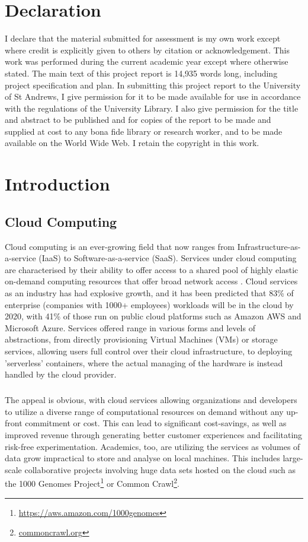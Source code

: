 \documentclass{report}
\begin{document}
\chapter*{Declaration}
I declare that the material submitted for assessment
is my own work except where credit is explicitly
given to others by citation or acknowledgement. This
work was performed during the current academic year
except where otherwise stated.
The main text of this project report is 14,935 words
long, including project specification and plan.
In submitting this project report to the University of St
Andrews, I give permission for it to be made
available for use in accordance with the regulations of the University Library. I also give permission for the title and abstract to be published and for copies of the report to be made and supplied at cost to any bona fide library or research worker, and to be made available on the World Wide Web. I retain the copyright in this work.
\newpage
\tableofcontents
\listoffigures
\newpage
{}
\chapter{Introduction}
\section{Cloud Computing}
Cloud computing is an ever-growing field that now ranges from Infrastructure-as-a-service (IaaS) to Software-as-a-service (SaaS). Services under cloud computing are characterised by their ability to offer access to a shared pool of highly elastic on-demand computing resources that offer broad network access \cite{Pallis2010, Mell2011}. Cloud services as an industry has had explosive growth, and it has been predicted that 83\% of enterprise (companies with 1000+ employees) workloads will be in the cloud by 2020\cite{Intricately2019}, with 41\% of those run on public cloud platforms such as Amazon AWS and Microsoft Azure. Services offered range in various forms and levels of abstractions, from directly provisioning Virtual Machines (VMs) or storage services, allowing users full control over their cloud infrastructure, to deploying 'serverless' containers, where the actual managing of the hardware is instead handled by the cloud provider.

\paragraph{}
The appeal is obvious, with cloud services allowing organizations and developers to utilize a diverse range of computational resources on demand without any up-front commitment or cost\cite{Armbrust2009}. This can lead to significant cost-savings, as well as improved revenue through generating better customer experiences and facilitating risk-free experimentation\cite{Power2018}. Academics, too, are utilizing the services as volumes of data grow impractical to store and analyse on local machines\cite{Berriman2013, Ruiz-Alvarez2011}. This includes large-scale collaborative projects involving huge data sets hosted on the cloud such as the 1000 Genomes Project\footnote{\url{https://aws.amazon.com/1000genomes}} or Common Crawl\footnote{\url{commoncrawl.org}}.
\end{document}
